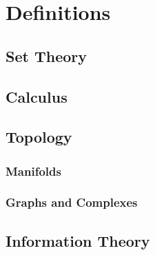 
\chapter{Definitions}
\label{ch:definitions}
\section{Set Theory}
\section{Calculus}
\section{Topology}
\subsection{Manifolds}
\subsection{Graphs and Complexes}
\section{Information Theory}
